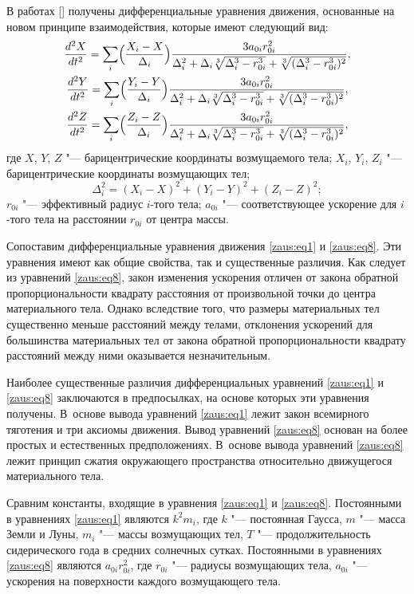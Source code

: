 В работах []  получены дифференциальные уравнения движения, основанные на новом принципе взаимодействия, которые имеют следующий вид:
\begin{gather}
\frac{d^2X}{dt^2}=\sum_i\Bigl(\frac{X_i-X}{\Delta_i}\Bigr)\frac{3a_{0i}r^2_{0i}}
{\Delta^2_i+\Delta_i\sqrt[3]{\Delta^3_i-r^3_{0i}}+\sqrt[3]{(\Delta^3_i-r^3_{0i})^2}},
\\
\frac{d^2Y}{dt^2}=\sum_i\Bigl(\frac{Y_i-Y}{\Delta_i}\Bigr)\frac{3a_{0i}r^2_{0i}}
{\Delta^2_i+\Delta_i\sqrt[3]{\Delta^3_i-r^3_{0i}}+\sqrt[3]{(\Delta^3_i-r^3_{0i})^2}},
\label{zaus:eq8}
\\
\frac{d^2Z}{dt^2}=\sum_i\Bigl(\frac{Z_i-Z}{\Delta_i}\Bigr)\frac{3a_{0i}r^2_{0i}}
{\Delta^2_i+\Delta_i\sqrt[3]{\Delta^3_i-r^3_{0i}}+\sqrt[3]{(\Delta^3_i-r^3_{0i})^2}},
\end{gather}
где $X$, $Y$, $Z$ "--- барицентрические координаты возмущаемого тела; 
$X_i$, $Y_i$, $Z_i$ "--- барицентрические координаты возмущающих тел; 
$$\Delta^2_i=(X_i-X)^2+(Y_i-Y)^2+(Z_i-Z)^2;$$ 
$r_{0i}$ "--- эффективный радиус $i$-того тела; 
$a_{0i}$ "--- соответствующее ускорение для $i$-того тела на расстоянии $r_{0i}$ от центра массы.



Сопоставим дифференциальные уравнения движения \eqref{zaus:eq1} и \eqref{zaus:eq8}. 
Эти уравнения имеют как общие свойства, так и существенные различия. Как следует из уравнений \eqref{zaus:eq8}, закон изменения ускорения отличен от закона обратной пропорциональности квадрату расстояния от произвольной точки до центра материального тела.
Однако вследствие того, что размеры материальных тел существенно меньше расстояний между телами, отклонения ускорений для большинства материальных тел от закона обратной пропорциональности квадрату расстояний между ними оказывается незначительным.

Наиболее существенные различия дифференциальных уравнений \eqref{zaus:eq1} и \eqref{zaus:eq8} заключаются в предпосылках, на основе которых эти уравнения получены. 
В~основе вывода уравнений \eqref{zaus:eq1} лежит закон всемирного тяготения и три аксиомы движения. 
Вывод уравнений \eqref{zaus:eq8} основан на более простых и естественных предположениях. 
В~основе вывода уравнений \eqref{zaus:eq8} лежит принцип сжатия окружающего пространства относительно движущегося материального тела.




Сравним константы, входящие в уравнения \eqref{zaus:eq1} и \eqref{zaus:eq8}. 
Постоянными в уравнениях \eqref{zaus:eq1} являются $k^2 m_i$, где $k$ "--- постоянная Гаусса, 
$m$ "--- масса Земли и Луны, 
$m_i$ "--- массы возмущающих тел, 
$T$ "--- продолжительность сидерического года в средних солнечных сутках. 
Постоянными в уравнениях \eqref{zaus:eq8} являются $a_{0i} r^2_{0i}$, где $r_{0i}$ "--- радиусы возмущающих тела, 
$a_{0i}$ "--- ускорения на поверхности каждого возмущающего тела.

